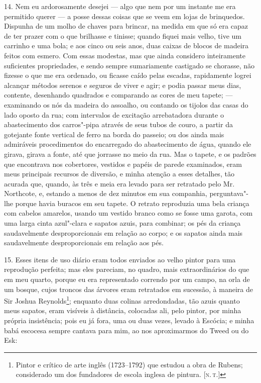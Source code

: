 14. Nem eu ardorosamente desejei --- algo que nem por um instante me era
permitido querer --- a posse dessas coisas que se veem em lojas de
brinquedos. Dispunha de um molho de chaves para brincar, na medida em
que só era capaz de ter prazer com o que brilhasse e tinisse; quando
fiquei mais velho, tive um carrinho e uma bola; e aos cinco ou seis
anos, duas caixas de blocos de madeira feitos com esmero. Com essas
modestas, mas que ainda considero inteiramente suficientes propriedades,
e sendo sempre sumariamente castigado se chorasse, não fizesse o que me
era ordenado, ou ficasse caído pelas escadas, rapidamente logrei
alcançar métodos serenos e seguros de viver e agir; e podia passar meus
dias, contente, desenhando quadrados e comparando as cores de meu
tapete; --- examinando os nós da madeira do assoalho, ou contando os
tijolos das casas do lado oposto da rua; com intervalos de excitação
arrebatadora durante o abastecimento dos carros"-pipa através de seus
tubos de couro, a partir da gotejante fonte vertical de ferro na borda
do passeio; ou dos ainda mais admiráveis procedimentos do encarregado do
abastecimento de água, quando ele girava, girava a fonte, até que
jorrasse no meio da rua. Mas o tapete, e os padrões que encontrava nos
cobertores, vestidos e papéis de parede examinados, eram meus principais
recursos de diversão, e minha atenção a esses detalhes, tão acurada que,
quando, às três e meia era levado para ser retratado pelo Mr.\,Northcote,
e, estando a menos de dez minutos em sua companhia, perguntava"-lhe
porque havia buracos em seu tapete. O retrato reproduzia uma bela
criança com cabelos amarelos, usando um vestido branco como se fosse uma
garota, com uma larga cinta azul"-clara e sapatos azuis, para combinar;
os pés da criança saudavelmente desproporcionais em relação ao corpo; e
os sapatos ainda mais saudavelmente desproporcionais em relação aos pés.

15. Esses itens de uso diário eram todos enviados ao velho pintor para
uma reprodução perfeita; mas eles pareciam, no quadro, mais
extraordinários do que em meu quarto, porque eu era representado
correndo por um campo, na orla de um bosque, cujos troncos das árvores
eram retratados em sucessão, à maneira de Sir Joshua Reynolds\footnote{Pintor
  e crítico de arte inglês (1723--1792) que estudou a obra de Rubens;
  considerado um dos fundadores de escola inglesa de pintura. {[}\textsc{n.\,t.}{]}}; enquanto duas colinas arredondadas, tão azuis quanto meus
sapatos, eram visíveis à distância, colocadas ali, pelo pintor, por
minha própria insistência; pois eu já fora, uma ou duas vezes, levado à
Escócia; e minha babá escocesa sempre cantava para mim, ao nos
aproximarmos do Tweed ou do Esk: %


